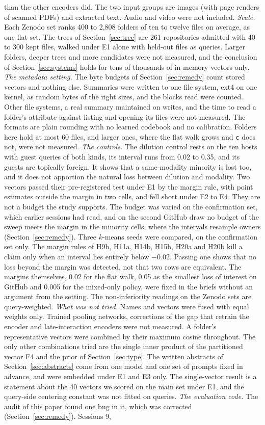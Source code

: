 \documentclass[11pt]{article}
\newcommand{\rep}[1]{\texttt{#1}}
\begin{document}
than the other encoders did. The two input groups are images (with page renders of scanned PDFs) and extracted text. Audio and video were not included. \emph{Scale.} Each Zenodo set ranks 400 to 2,808 folders of ten to twelve files on average, as one flat set. The trees of Section~\ref{sec:tree} are 261 repositories admitted with 40 to 300 kept files, walked under E1 alone with held-out files as queries. Larger folders, deeper trees and more candidates were not measured, and the conclusion of Section~\ref{sec:systems} holds for tens of thousands of in-memory vectors only. \emph{The metadata setting.} The byte budgets of Section~\ref{sec:remedy} count stored vectors and nothing else. Summaries were written to one file system, ext4 on one kernel, as random bytes of the right sizes, and the blocks read were counted. Other file systems, a real summary maintained on writes, and the time to read a folder's attribute against listing and opening its files were not measured. The formats are plain rounding with no learned codebook and no calibration. Folders here hold at most 60 files, and larger ones, where the flat walk grows and \rep{c} does not, were not measured. \emph{The controls.} The dilution control rests on the ten hosts with guest queries of both kinds, its interval runs from 0.02 to 0.35, and its guests are topically foreign. It shows that a same-modality minority is lost too, and it does not apportion the natural loss between dilution and modality. Two vectors passed their pre-registered test under E1 by the margin rule, with point estimates outside the margin in two cells, and fell short under E2 to E4. They are not a budget the study supports. The budget was varied on the confirmation set, which earlier sessions had read, and on the second GitHub draw no budget of the sweep meets the margin in the minority cells, where the intervals resample owners (Section~\ref{sec:remedy}). Three $k$-means seeds were compared, on the confirmation set only. The margin rules of H9b, H11a, H14b, H15b, H20a and H20b kill a claim only when an interval lies entirely below $-0.02$. Passing one shows that no loss beyond the margin was detected, not that two rows are equivalent. The margins themselves, 0.02 for the flat walk, 0.05 as the smallest loss of interest on GitHub and 0.005 for the mixed-only policy, were fixed in the briefs without an argument from the setting. The non-inferiority readings on the Zenodo sets are query-weighted. \emph{What was not tried.} Names and vectors were fused with equal weights only. Trained pooling networks, corrections of the gap that retrain the encoder and late-interaction encoders were not measured. A folder's representative vectors were combined by their maximum cosine throughout. The only other combinations tried are the single inner product of the partitioned vector F4 and the prior of Section~\ref{sec:type}. The written abstracts of Section~\ref{sec:abstracts} come from one model and one set of prompts fixed in advance, and were embedded under E1 and E3 only. The single-vector result is a statement about the 40 vectors we scored on the main set under E1, and the query-side centering constant was not fitted on queries. \emph{The evaluation code.} The audit of this paper found one bug in it, which was corrected (Section~\ref{sec:remedy}). Sessions 9, 
\end{document}
